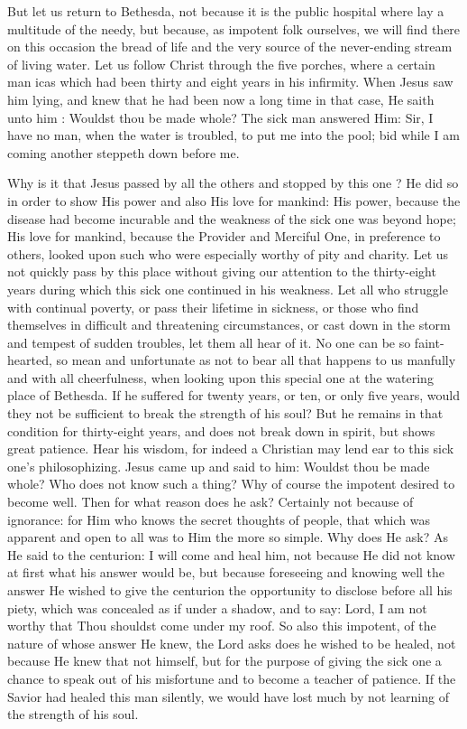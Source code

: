 But let us return to Bethesda, not because it is 
the public hospital where lay a multitude of the 
needy, but because, as impotent folk ourselves, 
we will find there on this occasion the bread of 
life and the very source of the never-ending 
stream of living water. Let us follow Christ 
through the five porches, where a certain man 
icas which had been thirty and eight years in 
his infirmity. When Jesus saw him lying, and 
knew that he had been now a long time in that 
case, He saith unto him : Wouldst thou be made 
whole? The sick man answered Him: Sir, I 
have no man, when the water is troubled, to put 
me into the pool; bid while I am coming another 
steppeth down before me. 

Why is it that Jesus passed by all the others 
and stopped by this one ? He did so in order to 
show His power and also His love for mankind:
His power, because the disease had become incurable
and the weakness of the sick one was 
beyond hope; His love for mankind, because 
the Provider and Merciful One, in preference to 
others, looked upon such who were especially 
worthy of pity and charity. Let us not quickly 
pass by this place without giving our attention 
to the thirty-eight years during which this sick 
one continued in his weakness. Let all who 
struggle with continual poverty, or pass their 
lifetime in sickness, or those who find themselves 
in difficult and threatening circumstances, or 
cast down in the storm and tempest of sudden 
troubles, let them all hear of it. No one can be 
so faint-hearted, so mean and unfortunate as not 
to bear all that happens to us manfully and 
with all cheerfulness, when looking upon this 
special one at the watering place of Bethesda. 
If he suffered for twenty years, or ten, or only 
five years, would they not be sufficient to break 
the strength of his soul? But he remains in 
that condition for thirty-eight years, and does 
not break down in spirit, but shows great 
patience. Hear his wisdom, for indeed a Christian
may lend ear to this sick one's philosophizing.
Jesus came up and said to him: Wouldst thou 
be made whole? Who does not know such
a thing? Why of course the impotent desired 
to become well. Then for what reason does he 
ask? Certainly not because of ignorance: for 
Him who knows the secret thoughts of people, 
that which was apparent and open to all was to 
Him the more so simple. Why does He ask? 
As He said to the centurion: I will come and 
heal him, not because He did not know at first 
what his answer would be, but because foreseeing 
and knowing well the answer He wished to 
give the centurion the opportunity to disclose 
before all his piety, which was concealed as 
if under a shadow, and to say: Lord, I am 
not worthy that Thou shouldst come under 
my roof. So also this impotent, of the nature 
of whose answer He knew, the Lord asks does 
he wished to be healed, not because He knew 
that not himself, but for the purpose of giving 
the sick one a chance to speak out of his misfortune
and to become a teacher of patience. 
If the Savior had healed this man silently, we 
would have lost much by not learning of the 
strength of his soul. 

